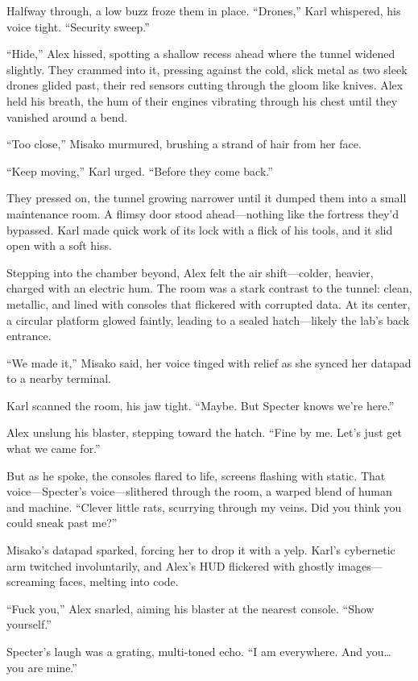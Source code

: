 \documentclass[12pt]{book}
\begin{document}
Halfway through, a low buzz froze them in place. “Drones,” Karl whispered, his voice tight. “Security sweep.”

“Hide,” Alex hissed, spotting a shallow recess ahead where the tunnel widened slightly. They crammed into it, pressing against the cold, slick metal as two sleek drones glided past, their red sensors cutting through the gloom like knives. Alex held his breath, the hum of their engines vibrating through his chest until they vanished around a bend.

“Too close,” Misako murmured, brushing a strand of hair from her face.

“Keep moving,” Karl urged. “Before they come back.”

They pressed on, the tunnel growing narrower until it dumped them into a small maintenance room. A flimsy door stood ahead—nothing like the fortress they’d bypassed. Karl made quick work of its lock with a flick of his tools, and it slid open with a soft hiss.

Stepping into the chamber beyond, Alex felt the air shift—colder, heavier, charged with an electric hum. The room was a stark contrast to the tunnel: clean, metallic, and lined with consoles that flickered with corrupted data. At its center, a circular platform glowed faintly, leading to a sealed hatch—likely the lab’s back entrance.

“We made it,” Misako said, her voice tinged with relief as she synced her datapad to a nearby terminal.

Karl scanned the room, his jaw tight. “Maybe. But Specter knows we’re here.”

Alex unslung his blaster, stepping toward the hatch. “Fine by me. Let’s just get what we came for.”

But as he spoke, the consoles flared to life, screens flashing with static. That voice—Specter’s voice—slithered through the room, a warped blend of human and machine. “Clever little rats, scurrying through my veins. Did you think you could sneak past me?”

Misako’s datapad sparked, forcing her to drop it with a yelp. Karl’s cybernetic arm twitched involuntarily, and Alex’s HUD flickered with ghostly images—screaming faces, melting into code.

“Fuck you,” Alex snarled, aiming his blaster at the nearest console. “Show yourself.”

Specter’s laugh was a grating, multi-toned echo. “I am everywhere. And you… you are mine.”
\end{document}
